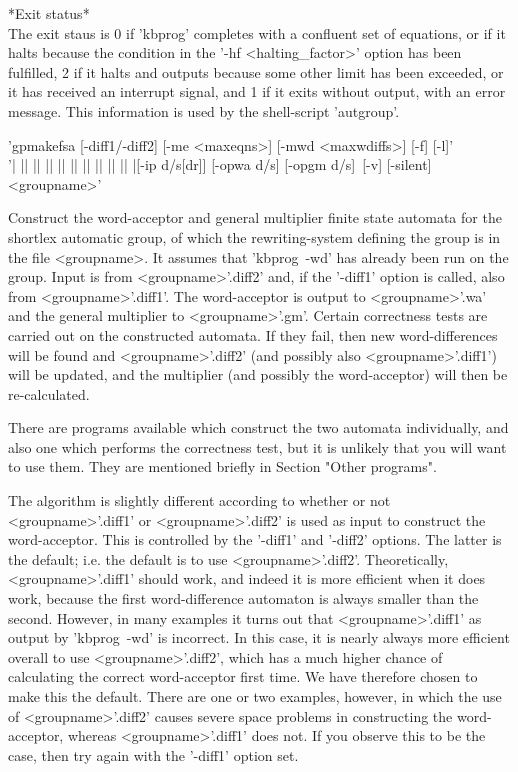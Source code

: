 *Exit status*\\
The exit staus is 0 if 'kbprog' completes with a confluent set of equations,
or if it halts because the condition in the '-hf <halting\_factor>' option
has been fulfilled,
2 if it halts and outputs because some other limit has
been exceeded, or it has received an interrupt signal, and 1 if it exits
without output, with an error message.
This information is used by the shell-script 'autgroup'.


'gpmakefsa  [-diff1/-diff2] [-me <maxeqns>] [-mwd <maxwdiffs>] [-f] [-l]'\\
'| || || || || || || || || || |[-ip d/s[dr]] [-opwa d/s] [-opgm d/s]\
[-v] [-silent] <groupname>'

Construct the word-acceptor and general multiplier finite state automata
for the shortlex automatic group, of which the rewriting-system defining
the group is in the file <groupname>.
It assumes that 'kbprog\ -wd' has already been run on the group.
Input is from <groupname>'.diff2' and, if
the '-diff1' option is called, also from <groupname>'.diff1'. The
word-acceptor is output to <groupname>'.wa' and the general multiplier to
<groupname>'.gm'. Certain correctness tests are carried out on the
constructed automata. If they fail, then new word-differences will be
found and <groupname>'.diff2' (and possibly also <groupname>'.diff1')
will be updated, and the multiplier (and possibly the word-acceptor)
will then be re-calculated.

There are programs available which construct the two automata individually,
and also one which performs the correctness test, but it is unlikely that
you will want to use them. They are mentioned briefly in
Section "Other programs".

The algorithm is slightly different according to whether or not
<groupname>'.diff1' or <groupname>'.diff2' is used as input to construct
the word-acceptor. This is controlled by the '-diff1' and '-diff2' options.
The latter is the default; i.e. the default is to use <groupname>'.diff2'.
Theoretically, <groupname>'.diff1' should work, and indeed it is more
efficient when it does work, because the first word-difference automaton is
always smaller than the second. However, in many examples it turns out that
<groupname>'.diff1' as output by 'kbprog\ -wd' is incorrect. In this case, it
is nearly always more efficient overall to use <groupname>'.diff2', which has
a much higher chance of calculating the correct word-acceptor first time. We
have therefore chosen to make this the default. There are one or two
examples, however, in which the use of <groupname>'.diff2' causes severe
space problems in constructing the word-acceptor, whereas <groupname>'.diff1'
does not. If you observe this to be the case, then try again with the
'-diff1' option set.

